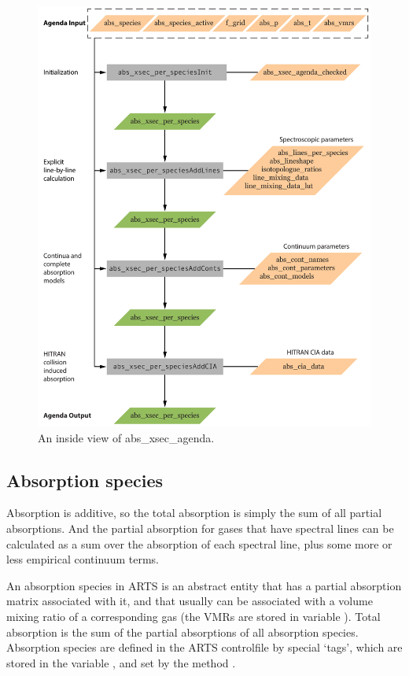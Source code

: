 \begin{figure}
 \begin{center}
  \includegraphics[scale=0.7]{abs_xsec_agenda}
  \caption{An inside view of abs\_xsec\_agenda.
  }
  \label{fig:absorption:xsec_inside}
 \end{center}
\end{figure}


\subsection{Absorption species}

Absorption is additive, so the total absorption is simply the sum of
all partial absorptions.  And the partial absorption for gases that
have spectral lines can be calculated as a sum over the absorption of
each spectral line, plus some more or less empirical continuum terms.

An absorption species in ARTS is an abstract entity that has a partial
absorption matrix associated with it, and that usually can be
associated with a volume mixing ratio of a corresponding gas (the VMRs
are stored in variable ). Total absorption is the
sum of the partial absorptions of all absorption species. Absorption
species are defined in the ARTS controlfile by special `tags', which
are stored in the variable , and set by the
method .

